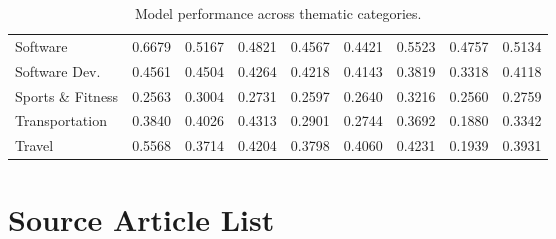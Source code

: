\documentclass[11pt]{article}
\begin{document}
\begin{table}[H]
\begin{tabular}{lcccccccc}
  Software           & 0.6679 & 0.5167 & 0.4821 & 0.4567 & 0.4421 & 0.5523 & 0.4757 & 0.5134 \\
  Software Dev.      & 0.4561 & 0.4504 & 0.4264 & 0.4218 & 0.4143 & 0.3819 & 0.3318 & 0.4118 \\
  Sports \& Fitness  & 0.2563 & 0.3004 & 0.2731 & 0.2597 & 0.2640 & 0.3216 & 0.2560 & 0.2759 \\
  Transportation     & 0.3840 & 0.4026 & 0.4313 & 0.2901 & 0.2744 & 0.3692 & 0.1880 & 0.3342 \\
  Travel             & 0.5568 & 0.3714 & 0.4204 & 0.3798 & 0.4060 & 0.4231 & 0.1939 & 0.3931 \\
  \bottomrule
  \end{tabular}
  \caption{Model performance across thematic categories.}
  \label{tab:model_evaluation_themes}
\end{table}

\section{Source Article List}
\label{sec:source-article-list}
\end{document}
